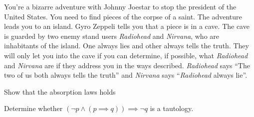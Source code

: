 \documentclass[a4paper]{exam}
\begin{document}
\begin{questions}
     You're a bizarre adventure with Johnny Joestar to stop the president of the United States. You need to find pieces of the corpse of a saint.
    The adventure leads you to an island. 
    Gyro Zeppeli tells you that a piece is in a cave. The cave is guarded by two enemy stand users \emph{Radiohead} and \emph{Nirvana}, who are inhabitants of the island. One always lies and other always tells the truth.
    They will only let you into the cave if you can determine, if possible, what \emph{Radiohead} and \emph{Nirvana} are if they address you in the ways described.
    \emph{Radiohead} says ``The two of us both always tells the truth'' and \emph{Nirvana} says ``\emph{Radiohead} always lie''.
    \begin{solution}
    \end{solution}

    Show that the absorption laws holds 
    

     Determine whether $(\neg p \land (p \implies q)) \implies \neg q$ is a tautology.



      
\end{questions}
\end{document}
